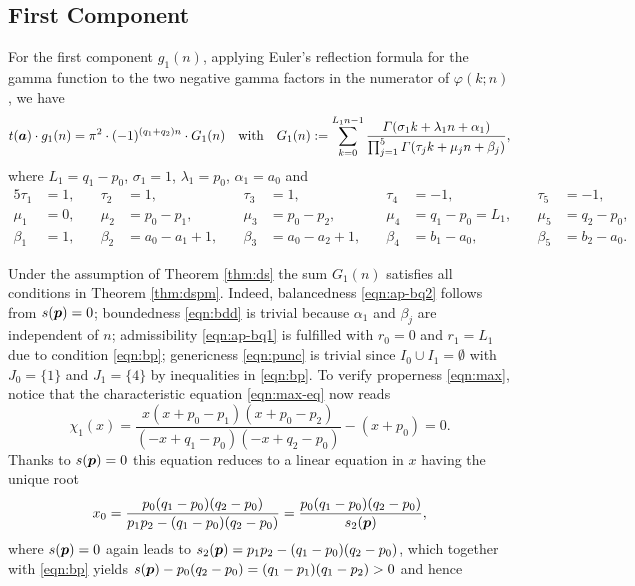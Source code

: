 \documentclass[a4paper,12pt]{article}
\theoremstyle{plain}
\def\vG{\varGamma}
\def\ba{\mbox{\boldmath $a$}}
\def\bp{\mbox{\boldmath $p$}}
\begin{document}
\subsection{First Component} \label{subsec:1st}
For the first component $g_1(n)$, applying Euler's reflection formula 
for the gamma function to the two negative gamma factors in the 
numerator of $\varphi(k; n)$, we have  
\[
t(\ba) \cdot g_1(n) = \pi^2 \cdot (-1)^{(q_1 + q_2) n} \cdot G_1(n)  
\quad \mbox{with} \quad 
G_1(n) := \sum_{k=0}^{L_1 n -1}  
\frac{\vG(\sigma_1 k + \lambda_1 n + \alpha_1)}{\prod_{j=1}^5 \vG(\tau_j k + \mu_j n + \beta_j)}, 
\]
where $L_1 = q_1-p_0$, $\sigma_1 = 1$, $\lambda_1 = p_0$, $\alpha_1 = a_0$ and 
\begin{alignat*}{5}
\tau_1 &= 1, \quad & \tau_2 &= 1, \quad & \tau_3 &= 1, \quad & \tau_4 &= -1, \quad & \tau_5 &= -1, \\
\mu_1 &= 0, \quad & \mu_2 &= p_0-p_1, \quad & \mu_3 &= p_0-p_2, \quad & 
\mu_4 &= q_1-p_0 = L_1, \quad & \mu_5 &= q_2-p_0, \\
\beta_1 &= 1, \quad & \beta_2 &= a_0-a_1+1, \quad & \beta_3 &= a_0-a_2+1, \quad & 
\beta_4 &= b_1-a_0, \quad & \beta_5 &= b_2-a_0.   
\end{alignat*}
\par
Under the assumption of Theorem \ref{thm:ds} the sum $G_1(n)$ 
satisfies all conditions in Theorem \ref{thm:dspm}.   
Indeed, balancedness \eqref{eqn:ap-bq2} follows from $s(\bp) = 0$; 
boundedness \eqref{eqn:bdd} is trivial because $\alpha_1$ and $\beta_j$ 
are independent of $n$; admissibility \eqref{eqn:ap-bq1} is fulfilled   
with $r_0 = 0$ and $r_1 = L_1$ due to condition \eqref{eqn:bp};  
genericness \eqref{eqn:punc} is trivial since $I_0 \cup I_1 = \emptyset$ 
with $J_0 = \{1\}$ and $J_1 = \{4\}$ by inequalities in \eqref{eqn:bp}.  
To verify properness \eqref{eqn:max}, notice that the characteristic 
equation \eqref{eqn:max-eq} now reads    
\[
\chi_1(x) = \dfrac{x(x+p_0-p_1)(x+p_0-p_2)}{(-x+q_1-p_0)(-x+q_2-p_0)} - (x+p_0) = 0.   
\]
Thanks to $s(\bp) = 0$ this equation reduces to a linear equation in $x$ 
having the unique root   
\[
x_0 = \frac{p_0(q_1-p_0)(q_2-p_0)}{p_1 p_2-(q_1-p_0)(q_2-p_0)}  
= \frac{p_0(q_1-p_0)(q_2-p_0)}{s_2(\bp)},  
\]
where $s(\bp) = 0$ again leads to $s_2(\bp) = 
p_1 p_2-(q_1-p_0)(q_2-p_0)$, which together with \eqref{eqn:bp} 
yields $s(\bp) -p_0(q_2-p_0) = (q_1-p_1)(q_1-p_2) > 0$ and hence   
\end{document}
